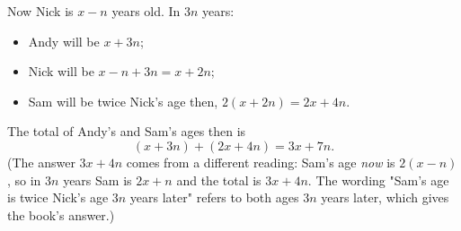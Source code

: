 Now Nick is $x-n$ years old. In $3n$ years:
\begin{itemize}
\item Andy will be $x+3n$;
\item Nick will be $x-n+3n=x+2n$;
\item Sam will be twice Nick's age then, $2(x+2n)=2x+4n$.
\end{itemize}
The total of Andy's and Sam's ages then is
\[
(x+3n)+(2x+4n)=\boxed{3x+7n}.
\]
(The answer $3x+4n$ comes from a different reading: Sam's age \emph{now} is $2(x-n)$, so in $3n$ years Sam is $2x+n$ and the total is $3x+4n$. The wording "Sam's age is twice Nick's age $3n$ years later" refers to both ages $3n$ years later, which gives the book's answer.)
